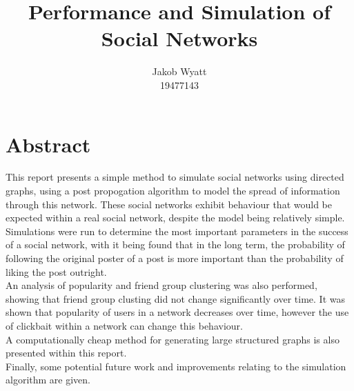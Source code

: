 \documentclass{article}
\title{Performance and Simulation of Social Networks}
\author{Jakob Wyatt\\19477143}
\begin{document}
\maketitle
\section{Abstract}
This report presents a simple method to simulate social networks using
directed graphs, using a post propogation algorithm to model the spread
of information through this network.
These social networks exhibit behaviour that would be expected
within a real social network, despite the model being relatively simple.\\
Simulations were run to determine the most important parameters in the
success of a social network, with it being found that in the long term,
the probability of following the original poster of a post is more important
than the probability of liking the post outright.\\
An analysis of popularity and friend group clustering was also performed,
showing that friend group clusting did not change significantly over time.
It was shown that popularity of users in a network decreases over time,
however the use of clickbait within a network can change this behaviour.\\
A computationally cheap method for generating large structured graphs
is also presented within this report.\\
Finally, some potential future work and improvements relating to the simulation
algorithm are given.

\pagebreak
\end{document}
